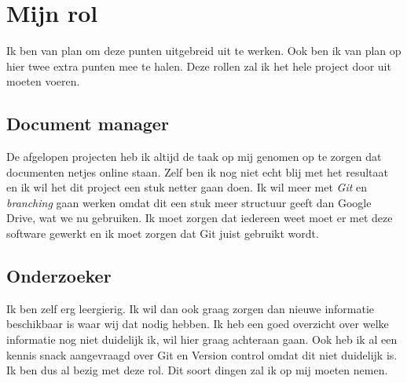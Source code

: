 \documentclass{article}
\begin{document}
\newpage

\section{Mijn rol}

Ik ben van plan om deze punten uitgebreid uit te werken.
Ook ben ik van plan op hier twee extra punten mee te halen.
Deze rollen zal ik het hele project door uit moeten voeren.

\subsection{Document manager}

De afgelopen projecten heb ik altijd de taak op mij genomen op te zorgen dat documenten netjes online staan.
Zelf ben ik nog niet echt blij met het resultaat en ik wil het dit project een stuk netter gaan doen.
Ik wil meer met \emph{Git} en \emph{branching} gaan werken omdat dit een stuk meer structuur geeft dan Google Drive, wat we nu gebruiken.
Ik moet zorgen dat iedereen weet moet er met deze software gewerkt en ik moet zorgen dat Git juist gebruikt wordt.

\subsection{Onderzoeker}
Ik ben zelf erg leergierig.
Ik wil dan ook graag zorgen dan nieuwe informatie beschikbaar is waar wij dat nodig hebben.
Ik heb een goed overzicht over welke informatie nog niet duidelijk ik, wil hier graag achteraan gaan. 
Ook heb ik al een kennis snack aangevraagd over Git en Version control omdat dit niet duidelijk is.
Ik ben dus al bezig met deze rol.
Dit soort dingen zal ik op mij moeten nemen.
\end{document}
